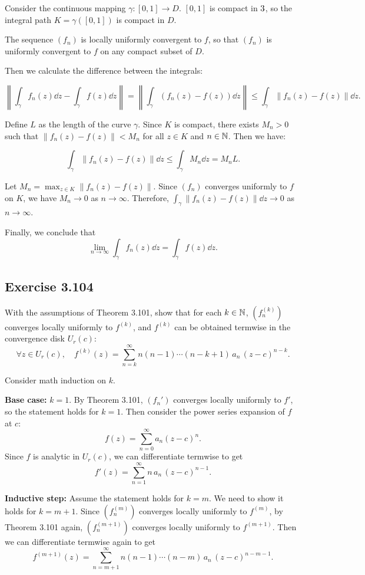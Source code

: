 \documentclass{article}
\begin{document}
\begin{solution}
  Consider the continuous mapping $\gamma: [0,1] \to D$. $[0,1]$ is
  compact in $3$, so the integral path $K = \gamma([0,1])$ is compact in $D$.

  The sequence $(f_n)$ is locally uniformly convergent to $f$, so
  that $(f_n)$ is uniformly convergent to $f$ on any compact subset of $D$.

  Then we calculate the difference between the integrals:

  \[
    \left\|\int_\gamma f_n(z) \dd z - \int_\gamma f(z) \dd z\right\|
    = \left\|\int_\gamma (f_n(z) - f(z)) \dd z\right\| \leq
    \int_\gamma \|f_n(z) - f(z)\| \dd z.
  \]

  Define $L$ as the length of the curve $\gamma$. Since $K$ is
  compact, there exists $M_n > 0$ such that $\|f_n(z) - f(z)\| < M_n$ for
  all $z \in K$ and $n \in \mathbb{N}$. Then we have:

  \[
    \int_\gamma \|f_n(z) - f(z)\| \dd z
    \leq \int_\gamma M_n \dd z = M_n L.
  \]

  Let $M_n = \max_{z \in K} \|f_n(z) - f(z)\|$. Since $(f_n)$
  converges uniformly to $f$ on $K$, we have $M_n \to 0$ as $n \to
  \infty$. Therefore, $\int_\gamma \|f_n(z) - f(z)\| \dd z \to 0$ as
  $n \to \infty$.

  Finally, we conclude that
  \[
    \lim_{n\to\infty} \int_\gamma f_n(z)\dd z
    = \int_\gamma f(z)\dd z.
  \]

\end{solution}

\subsection{Exercise 3.104}

With the assumptions of Theorem 3.101, show that
for each $k \in \mathbb{N}$,
$(f_n^{(k)})$ converges locally uniformly to $f^{(k)}$,
and $f^{(k)}$ can be obtained termwise in the
convergence disk $U_r(c)$:
\[
  \forall z \in U_r(c),\quad
  f^{(k)}(z)
  = \sum_{n=k}^{\infty} n(n-1)\cdots(n-k+1)\,a_n\,(z-c)^{n-k}.
\]

\begin{solution}
  Consider math induction on $k$.

  \textbf{Base case:} $k = 1$.
  By Theorem 3.101, $(f_n')$ converges locally uniformly to $f'$, so
  the statement holds for $k = 1$.
  Then consider the power series expansion of $f$ at $c$:
  \[
    f(z) = \sum_{n=0}^{\infty} a_n (z-c)^n.
  \]
  Since $f$ is analytic in $U_r(c)$, we can differentiate termwise
  to get
  \[
    f'(z) = \sum_{n=1}^{\infty} n\,a_n\,(z-c)^{n-1}.
  \]

  \textbf{Inductive step:} Assume the statement holds for $k = m$.
  We need to show it holds for $k = m + 1$.
  Since $(f_n^{(m)})$ converges locally uniformly to $f^{(m)}$, by
  Theorem 3.101 again, $(f_n^{(m+1)})$ converges locally uniformly to
  $f^{(m+1)}$.
  Then we can differentiate termwise again to get
  \[
    f^{(m+1)}(z) = \sum_{n=m+1}^{\infty} n(n-1)\cdots(n-m)\,a_n\,(z-c)^{n-m-1}.
  \]


\end{solution}
\end{document}
